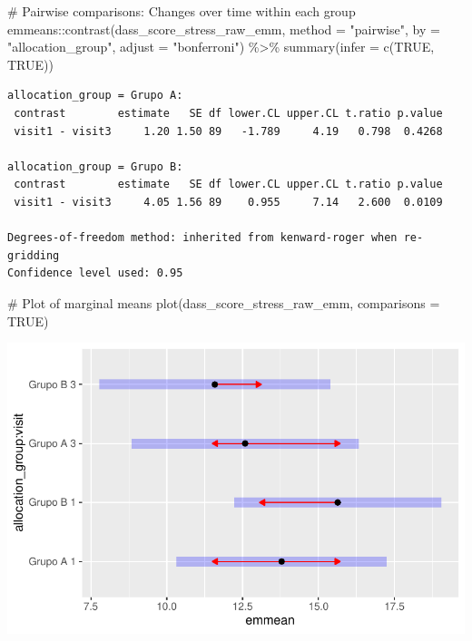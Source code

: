 \documentclass[
  letterpaper,
  DIV=11,
  numbers=noendperiod]{scrartcl}
\newenvironment{Shaded}{\begin{snugshade}}{\end{snugshade}}
\newcommand{\AttributeTok}[1]{\textcolor[rgb]{0.40,0.45,0.13}{#1}}
\newcommand{\CommentTok}[1]{\textcolor[rgb]{0.37,0.37,0.37}{#1}}
\newcommand{\ConstantTok}[1]{\textcolor[rgb]{0.56,0.35,0.01}{#1}}
\newcommand{\FunctionTok}[1]{\textcolor[rgb]{0.28,0.35,0.67}{#1}}
\newcommand{\NormalTok}[1]{\textcolor[rgb]{0.00,0.23,0.31}{#1}}
\newcommand{\SpecialCharTok}[1]{\textcolor[rgb]{0.37,0.37,0.37}{#1}}
\newcommand{\StringTok}[1]{\textcolor[rgb]{0.13,0.47,0.30}{#1}}
\begin{document}
\begin{Shaded}
\begin{Highlighting}[]
\CommentTok{\# Pairwise comparisons: Changes over time within each group}
\NormalTok{emmeans}\SpecialCharTok{::}\FunctionTok{contrast}\NormalTok{(dass\_score\_stress\_raw\_emm, }\AttributeTok{method =} \StringTok{"pairwise"}\NormalTok{, }\AttributeTok{by =} \StringTok{"allocation\_group"}\NormalTok{, }\AttributeTok{adjust =} \StringTok{"bonferroni"}\NormalTok{) }\SpecialCharTok{\%\textgreater{}\%} \FunctionTok{summary}\NormalTok{(}\AttributeTok{infer =} \FunctionTok{c}\NormalTok{(}\ConstantTok{TRUE}\NormalTok{, }\ConstantTok{TRUE}\NormalTok{))}
\end{Highlighting}
\end{Shaded}

\begin{verbatim}
allocation_group = Grupo A:
 contrast        estimate   SE df lower.CL upper.CL t.ratio p.value
 visit1 - visit3     1.20 1.50 89   -1.789     4.19   0.798  0.4268

allocation_group = Grupo B:
 contrast        estimate   SE df lower.CL upper.CL t.ratio p.value
 visit1 - visit3     4.05 1.56 89    0.955     7.14   2.600  0.0109

Degrees-of-freedom method: inherited from kenward-roger when re-gridding 
Confidence level used: 0.95 
\end{verbatim}

\begin{Shaded}
\begin{Highlighting}[]
\CommentTok{\# Plot of marginal means}
\FunctionTok{plot}\NormalTok{(dass\_score\_stress\_raw\_emm, }\AttributeTok{comparisons =} \ConstantTok{TRUE}\NormalTok{)}
\end{Highlighting}
\end{Shaded}

\includegraphics{Outcomes_V1V2V3_files/figure-pdf/dass_score_stress_raw_emm-1.pdf}
\end{document}
